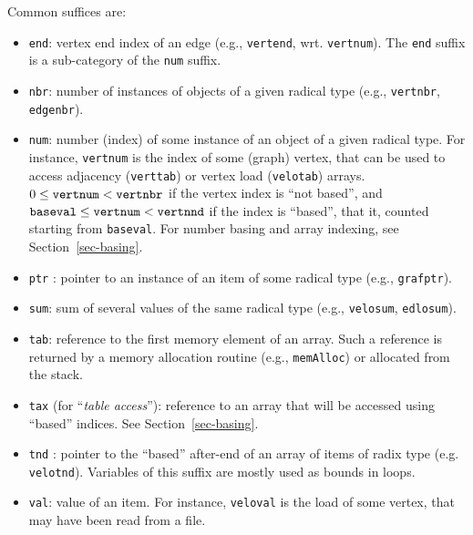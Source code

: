 Common suffices are:
\begin{itemize}
\item
\texttt{end}: vertex end index of an edge (e.g.,
\texttt{vertend}, wrt. \texttt{vertnum}). The \texttt{end} suffix is
a sub-category of the \texttt{num} suffix.
\item
\texttt{nbr}: number of instances of objects of a given radical
type (e.g., \texttt{vertnbr}, \texttt{edgenbr}).
\item
\texttt{num}: number (index) of some instance of an object of a given
radical type. For instance, \texttt{vertnum} is the index of some
(graph) vertex, that can be used to access adjacency
(\texttt{verttab}) or vertex load (\texttt{velotab}) arrays.
$0 \leq \mbox{\texttt{vertnum}} < \mbox{\texttt{vertnbr}}$ if the
vertex index is ``not based'', and $\mbox{\texttt{baseval}} \leq
\mbox{\texttt{vertnum}} < \mbox{\texttt{vertnnd}}$
if the index is ``based'', that it, counted starting from
\texttt{baseval}. For number basing and array indexing, see
Section~\ref{sec-basing}.
\item
\texttt{ptr} : pointer to an instance of an item of some radical type
(e.g., \texttt{grafptr}).
\item
\texttt{sum}: sum of several values of the same radical type (e.g.,
\texttt{velosum}, \texttt{edlosum}).
\item
\texttt{tab}: reference to the first memory element of an array. Such
a reference is returned by a memory allocation routine (e.g.,
\texttt{mem\lbt Alloc}) or allocated from the stack.
\item
\texttt{tax} (for ``\textit{table access}''): reference to an array
that will be accessed using ``based'' indices. See
Section~\ref{sec-basing}.
\item
\texttt{tnd} : pointer to the ``based'' after-end of an array of items
of radix type (e.g. \texttt{velotnd}). Variables of this suffix are
mostly used as bounds in loops.
\item
\texttt{val}: value of an item. For instance, \texttt{veloval} is the
load of some vertex, that may have been read from a file.
\end{itemize}

